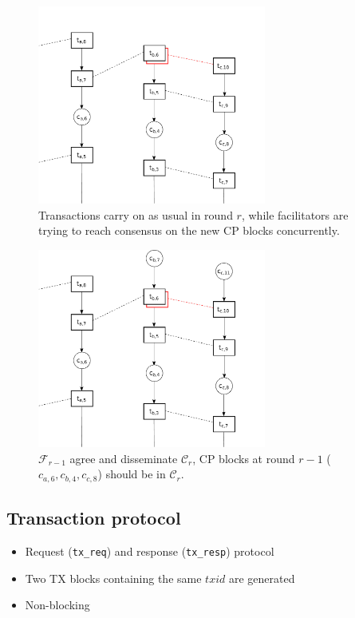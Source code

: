 \documentclass{beamer}
\newcommand{\C}{\mathcal{C}}
\newcommand{\F}{\mathcal{F}}
\begin{document}
\begin{frame}{\subsecname}
  \begin{figure}[h]
  \includegraphics[width=0.67\textwidth]{trustchain-3}
  \centering
  \caption{Transactions carry on as usual in round $r$,
  while facilitators are trying to reach consensus on the new CP blocks concurrently.}
  \end{figure}
\end{frame}

\begin{frame}{\subsecname}
  \begin{figure}[h]
  \includegraphics[width=0.67\textwidth]{trustchain-4}
  \centering
  \caption{$\F_{r-1}$ agree and disseminate $\C_r$,
  CP blocks at round $r-1$ ($c_{a, 6}, c_{b, 4}, c_{c,8}$) should be in $\C_r$.}
  \end{figure}
\end{frame}

\subsection{Transaction protocol}
\begin{frame}{\subsecname}
\begin{itemize}
\item Request (\texttt{tx\_req}) and response (\texttt{tx\_resp}) protocol
\item Two TX blocks containing the same $txid$ are generated
\item Non-blocking
\end{itemize}
\end{frame}
\end{document}
